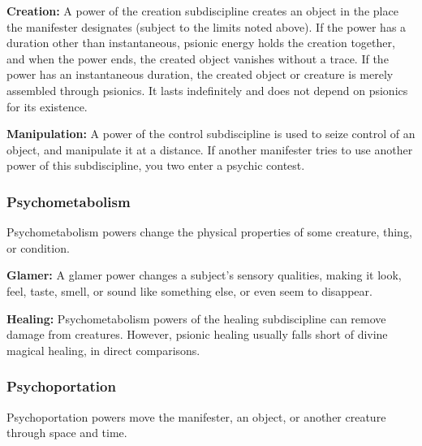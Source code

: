 \textbf{Creation:} A power of the creation subdiscipline creates an object in the place the manifester designates (subject to the limits noted above). If the power has a duration other than instantaneous, psionic energy holds the creation together, and when the power ends, the created object vanishes without a trace. If the power has an instantaneous duration, the created object or creature is merely assembled through psionics. It lasts indefinitely and does not depend on psionics for its existence.

\textbf{Manipulation:} A power of the control subdiscipline is used to seize control of an object, and manipulate it at a distance. If another manifester tries to use another power of this subdiscipline, you two enter a psychic contest.


\subsubsection{Psychometabolism}
Psychometabolism powers change the physical properties of some creature, thing, or condition.


\textbf{Glamer:} A glamer power changes a subject's sensory qualities, making it look, feel, taste, smell, or sound like something else, or even seem to disappear.

\textbf{Healing:} Psychometabolism powers of the healing subdiscipline can remove damage from creatures. However, psionic healing usually falls short of divine magical healing, in direct comparisons.

\subsubsection{Psychoportation}
Psychoportation powers move the manifester, an object, or another creature through space and time.


